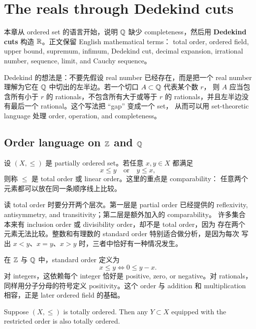 \chapter{The reals through Dedekind cuts}
\label{chap:reals-dedekind}

本章从 ordered set 的语言开始，说明 \(\mathbb{Q}\) 缺少 completeness，然后用
\textbf{Dedekind cuts} 构造 \(\mathbb{R}\)。正文保留 English mathematical terms：
total order, ordered field, upper bound, supremum, infimum, Dedekind cut,
decimal expansion, irrational number, sequence, limit, and Cauchy sequence。

Dedekind 的想法是：不要先假设 real number 已经存在，而是把一个 real number
理解为它在 \(\mathbb{Q}\) 中切出的左半边。若一个切口 \(A\subset\mathbb{Q}\) 代表某个数 \(r\)，
则 \(A\) 应当包含所有小于 \(r\) 的 rationals，不包含所有大于或等于 \(r\) 的
rationals，并且左半边没有最后一个 rational。这个写法把 ``gap'' 变成一个 set，
从而可以用 set-theoretic language 处理 order, operation, and completeness。

\section{Order language on \texorpdfstring{\(\mathbb{Z}\)}{Z} and \texorpdfstring{\(\mathbb{Q}\)}{Q}}

\begin{definition}
设 \((X,\leq)\) 是 partially ordered set。若任意 \(x,y\in X\) 都满足
\[
  x\leq y \quad\text{or}\quad y\leq x,
\]
则称 \(\leq\) 是 total order 或 linear order。这里的重点是 comparability：
任意两个元素都可以放在同一条顺序线上比较。
\end{definition}

读 total order 时要分开两个层次。第一层是 partial order 已经提供的
reflexivity, antisymmetry, and transitivity；第二层是额外加入的 comparability。
许多集合本来有 inclusion order 或 divisibility order，却不是 total order，因为
存在两个元素无法比较。整数和有理数的 standard order 特别适合做分析，是因为每次
写出 \(x<y\)、\(x=y\)、\(x>y\) 时，三者中恰好有一种情况发生。

在 \(\mathbb{Z}\) 与 \(\mathbb{Q}\) 中，standard order 定义为
\[
  x\leq y \Longleftrightarrow 0\leq y-x.
\]
对 integers，这依赖每个 integer 恰好是 positive, zero, or negative。对 rationals，
同样用分子分母的符号定义 positivity。这个 order 与 addition 和 multiplication
相容，正是 later ordered field 的基础。

\begin{exerciseblock}
Suppose \((X,\leq)\) is totally ordered. Then any \(Y\subset X\) equipped with
the restricted order is also totally ordered.
\end{exerciseblock}

